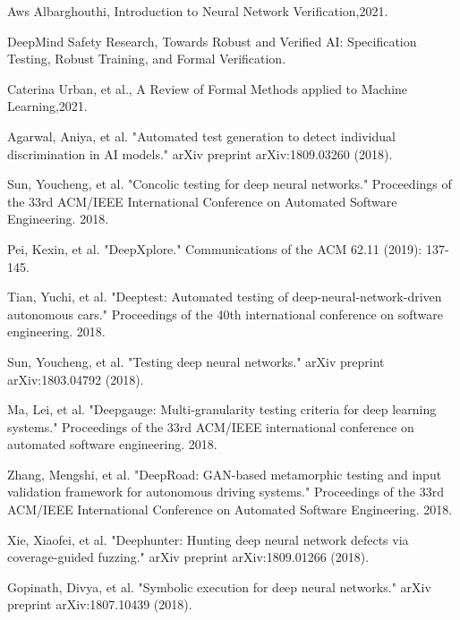 \begin{singlespace}
\begin{thebibliography}{}
    Aws Albarghouthi, Introduction to Neural Network Verification,2021.
    
    DeepMind Safety Research, Towards Robust and Verified AI: Specification Testing, Robust Training, and Formal Verification.

    Caterina Urban, et al., A Review of Formal Methods applied to Machine Learning,2021.

    






 Agarwal, Aniya, et al. "Automated test generation to detect individual discrimination in AI models." arXiv preprint arXiv:1809.03260 (2018).

 Sun, Youcheng, et al. "Concolic testing for deep neural networks." Proceedings of the 33rd ACM/IEEE International Conference on Automated Software Engineering. 2018.

 Pei, Kexin, et al. "DeepXplore." Communications of the ACM 62.11 (2019): 137-145.

 Tian, Yuchi, et al. "Deeptest: Automated testing of deep-neural-network-driven autonomous cars." Proceedings of the 40th international conference on software engineering. 2018.

 Sun, Youcheng, et al. "Testing deep neural networks." arXiv preprint arXiv:1803.04792 (2018).

 Ma, Lei, et al. "Deepgauge: Multi-granularity testing criteria for deep learning systems." Proceedings of the 33rd ACM/IEEE international conference on automated software engineering. 2018.

 Zhang, Mengshi, et al. "DeepRoad: GAN-based metamorphic testing and input validation framework for autonomous driving systems." Proceedings of the 33rd ACM/IEEE International Conference on Automated Software Engineering. 2018.

 Xie, Xiaofei, et al. "Deephunter: Hunting deep neural network defects via coverage-guided fuzzing." arXiv preprint arXiv:1809.01266 (2018).

	Gopinath, Divya, et al. "Symbolic execution for deep neural networks." arXiv preprint arXiv:1807.10439 (2018).



\end{thebibliography}
\end{singlespace}
